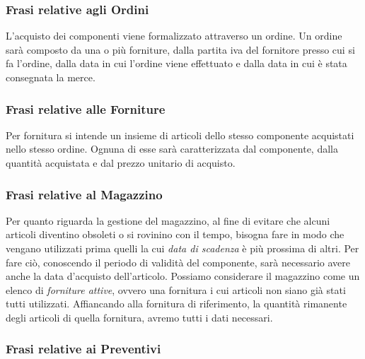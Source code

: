 		\subsubsection{Frasi relative agli Ordini}
		
			L'acquisto dei componenti viene formalizzato attraverso un ordine. Un ordine sarà composto da una o più forniture, dalla partita iva del fornitore presso cui si fa l'ordine, dalla data in cui l'ordine viene effettuato e dalla data in cui è stata consegnata la merce.
		
		\subsubsection{Frasi relative alle Forniture}
		
			Per fornitura si intende un insieme di articoli dello stesso componente acquistati nello stesso ordine. Ognuna di esse sarà caratterizzata dal componente, dalla quantità acquistata e dal prezzo unitario di acquisto.
			
		\subsubsection{Frasi relative al Magazzino}
			
			Per quanto riguarda la gestione del magazzino, al fine di evitare che alcuni articoli diventino obsoleti o si rovinino con il tempo, bisogna fare in modo che vengano utilizzati prima quelli la cui \emph{data di scadenza} è più prossima di altri. Per fare ciò, conoscendo il periodo di validità del componente, sarà necessario avere anche la data d'acquisto dell'articolo.
			Possiamo considerare il magazzino come un elenco di \emph{forniture attive}, ovvero una fornitura i cui articoli non siano già stati tutti utilizzati. Affiancando alla fornitura di riferimento, la quantità rimanente degli articoli di quella fornitura, avremo tutti i dati necessari.
			
		\subsubsection{Frasi relative ai Preventivi}
		\label{sec:frasi_preventivi}
			
